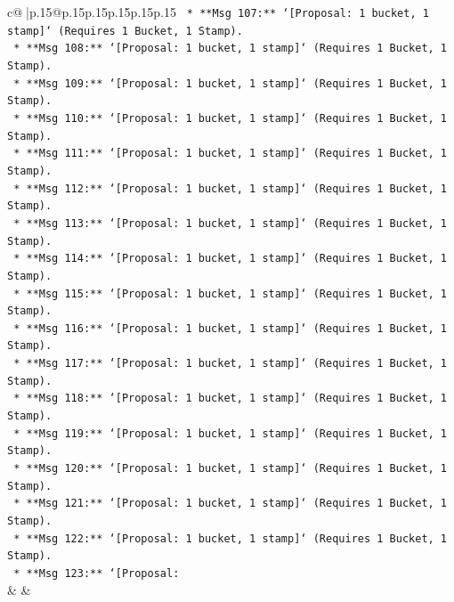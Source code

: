 \documentclass{article}
\begin{document}
{\begin{supertabular}{c@{$\;$}|p{.15\linewidth}@{}p{.15\linewidth}p{.15\linewidth}p{.15\linewidth}p{.15\linewidth}p{.15\linewidth}}
{{{\texttt{                *   **Msg 107:** `{[}Proposal: 1 bucket, 1 stamp{]}` (Requires 1 Bucket, 1 Stamp).} \\
\texttt{                *   **Msg 108:** `{[}Proposal: 1 bucket, 1 stamp{]}` (Requires 1 Bucket, 1 Stamp).} \\
\texttt{                *   **Msg 109:** `{[}Proposal: 1 bucket, 1 stamp{]}` (Requires 1 Bucket, 1 Stamp).} \\
\texttt{                *   **Msg 110:** `{[}Proposal: 1 bucket, 1 stamp{]}` (Requires 1 Bucket, 1 Stamp).} \\
\texttt{                *   **Msg 111:** `{[}Proposal: 1 bucket, 1 stamp{]}` (Requires 1 Bucket, 1 Stamp).} \\
\texttt{                *   **Msg 112:** `{[}Proposal: 1 bucket, 1 stamp{]}` (Requires 1 Bucket, 1 Stamp).} \\
\texttt{                *   **Msg 113:** `{[}Proposal: 1 bucket, 1 stamp{]}` (Requires 1 Bucket, 1 Stamp).} \\
\texttt{                *   **Msg 114:** `{[}Proposal: 1 bucket, 1 stamp{]}` (Requires 1 Bucket, 1 Stamp).} \\
\texttt{                *   **Msg 115:** `{[}Proposal: 1 bucket, 1 stamp{]}` (Requires 1 Bucket, 1 Stamp).} \\
\texttt{                *   **Msg 116:** `{[}Proposal: 1 bucket, 1 stamp{]}` (Requires 1 Bucket, 1 Stamp).} \\
\texttt{                *   **Msg 117:** `{[}Proposal: 1 bucket, 1 stamp{]}` (Requires 1 Bucket, 1 Stamp).} \\
\texttt{                *   **Msg 118:** `{[}Proposal: 1 bucket, 1 stamp{]}` (Requires 1 Bucket, 1 Stamp).} \\
\texttt{                *   **Msg 119:** `{[}Proposal: 1 bucket, 1 stamp{]}` (Requires 1 Bucket, 1 Stamp).} \\
\texttt{                *   **Msg 120:** `{[}Proposal: 1 bucket, 1 stamp{]}` (Requires 1 Bucket, 1 Stamp).} \\
\texttt{                *   **Msg 121:** `{[}Proposal: 1 bucket, 1 stamp{]}` (Requires 1 Bucket, 1 Stamp).} \\
\texttt{                *   **Msg 122:** `{[}Proposal: 1 bucket, 1 stamp{]}` (Requires 1 Bucket, 1 Stamp).} \\
\texttt{                *   **Msg 123:** `{[}Proposal:} \\
            }
        }
    }
    & & \\ \\


\end{supertabular}}
\end{document}
